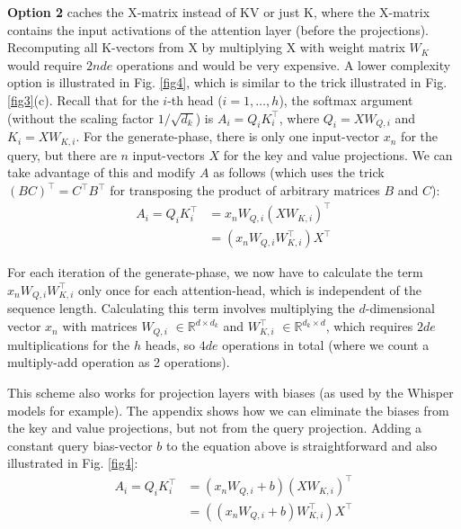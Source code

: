 \documentclass{article}
\newcommand{\eR}[2]{$\in \mathbb{R}^{#1 \times #2}$} %
\begin{document}
\textbf{Option 2} caches the X-matrix instead of KV or just K, where the X-matrix contains the input activations of the attention layer (before the projections). Recomputing all K-vectors from X by multiplying X with weight matrix $W_K$ would require $2 n d e$ operations and would be very expensive. A lower complexity option is illustrated in Fig. \ref{fig4}, which is similar to the trick illustrated in Fig. \ref{fig3}(c).
Recall that for the $i$-th head ($i = 1, \ldots, h$), the softmax argument (without the scaling factor $1/\sqrt{d_k}$) is $A_i = Q_i K_i^\top$, where $Q_i = X W_{Q,i}$ and $K_i = X W_{K,i}$. For the generate-phase, there is only one input-vector $x_n$ for the query, but there are $n$ input-vectors $X$ for the key and value projections. We can take advantage of this and modify $A$ as follows (which uses the trick $(B C)^\top = C^\top B^\top$ for transposing the product of arbitrary matrices $B$ and $C$):
\begin{equation*} \begin{aligned}
  A_i = Q_i K_i^\top &= x_n W_{Q,i} (X W_{K,i})^\top \\
                     &= (x_n W_{Q,i} W_{K,i}^\top) X^\top
\end{aligned} \end{equation*}

For each iteration of the generate-phase, we now have to calculate the term $x_n W_{Q,i} W_{K,i}^\top$ only once for each attention-head, which is independent of the sequence length. Calculating this term involves multiplying the $d$-dimensional vector $x_n$ with matrices $W_{Q,i}$ \eR{d}{d_k} and $W_{K,i}^\top$ \eR{d_k}{d}, which requires $2 d e$ multiplications for the $h$ heads, so $4 d e$ operations in total (where we count a multiply-add operation as 2 operations).

This scheme also works for projection layers with biases (as used by the Whisper models for example). The appendix shows how we can eliminate the biases from the key and value projections, but not from the query projection. Adding a constant query bias-vector $b$ to the equation above is straightforward and also illustrated in Fig. \ref{fig4}:
\begin{equation*} \begin{aligned}
  A_i = Q_i K_i^\top &= (x_n W_{Q,i} + b) (X W_{K,i})^\top \\
                     &= ((x_n W_{Q,i} + b) W_{K,i}^\top) X^\top
\end{aligned} \end{equation*}
\end{document}
